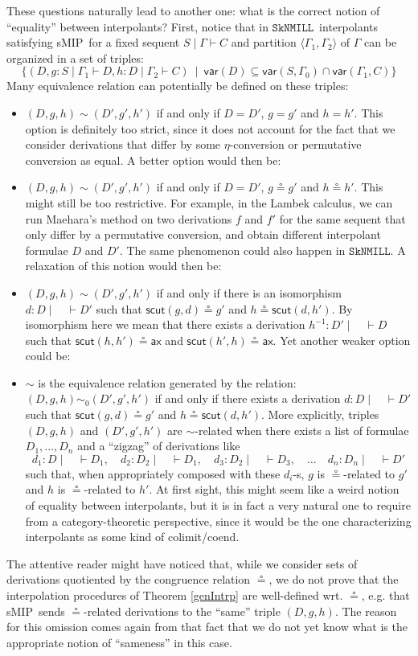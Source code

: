 \documentclass[sn-mathphys-num]{sn-jnl}%
\newcommand{\GG}{\Gamma}
\newcommand{\vd}{\vdash}
\newcommand{\ax}{\mathsf{ax}}
\newcommand{\SkNMILL}{$\mathtt{SkNMILL}$}
\newcommand{\mf}[1]{\mathsf{#1}}
\newcommand{\vars}[1]{\mf{var} (#1)}
\newcommand{\scut}[2]{\mf{scut} (#1 , #2)}
\newcommand{\sMIP}{\textsf{sMIP}}
\theoremstyle{thmstyleone}%
\theoremstyle{thmstyletwo}%
\theoremstyle{thmstylethree}%
\begin{document}
These questions naturally lead to another one: what is the correct notion of ``equality'' between interpolants?
First, notice that in \SkNMILL~interpolants satisfying \sMIP~for a fixed sequent $S \mid \GG \vd C$ and partition $\langle \GG_1,\GG_2 \rangle$ of $\GG$ can be organized in a set of triples:
\[
\{
(D, g : S \mid \GG_1 \vd D, h: D \mid \GG_2 \vd C) \ \mid \
\vars{D} \subseteq \vars{S , \GG_0} \cap \vars{\GG_1 , C}
\}
\]
Many equivalence relation can potentially be defined on these triples:
\begin{itemize}
\item $(D,g,h) \sim (D',g',h')$ if and only if $D = D'$, $g = g'$ and $h = h'$. This option is definitely too strict, since it does not account for the fact that we consider derivations that differ by some $\eta$-conversion or permutative conversion as equal. A better option would then be:
\item $(D,g,h) \sim (D',g',h')$ if and only if $D = D'$, $g \circeq g'$ and $h \circeq h'$. This might still be too restrictive. For example, in the Lambek calculus, we can run Maehara's method on two derivations $f$ and $f'$ for the same sequent that only differ by a permutative conversion, and obtain different interpolant formulae $D$ and $D'$. The same phenomenon could also happen in \SkNMILL. A relaxation of this notion would then be:
\item $(D,g,h) \sim (D',g',h')$ if and only if there is an isomorphism $d : D \mid \quad \vd D'$ such that $\mf{scut} (g,d) \circeq g'$ and $h \circeq \mf{scut} (d,h')$. By isomorphism here we mean that there exists a derivation $h^{-1} : D' \mid \quad \vd D$ such that $\scut{h}{h'} \circeq \ax$ and $\scut{h'}{h} \circeq \ax$. Yet another weaker option could be:
\item $\sim$ is the equivalence relation generated by the relation:
  $(D,g,h) \sim_0 (D',g',h')$ if and only if there exists a derivation $d : D \mid \quad \vd D'$ such that $\mf{scut} (g,d) \circeq g'$ and $h \circeq \mf{scut} (d,h')$. More explicitly, triples $(D,g,h)$ and $(D',g',h')$ are $\sim$-related when there exists a
list of formulae $D_1,\dots,D_n$ and a ``zigzag'' of derivations like
  \[
  d_1 : D \mid \quad \vd D_1,
  \quad
  d_2 : D_2 \mid \quad \vd D_1,
  \quad
  d_3 : D_2 \mid \quad \vd D_3,
  \quad
  \dots
  \quad
  d_n : D_n \mid \quad \vd D'
  \]
  such that, when appropriately composed with these $d_i$-s, $g$ is $\circeq$-related to $g'$ and $h$ is $\circeq$-related to $h'$.
  At first sight, this might seem like a weird notion of equality between interpolants, but it is in fact a very natural one to require from a category-theoretic perspective,  since it would be the one characterizing interpolants as some kind of colimit/coend.
\end{itemize}
The attentive reader might have noticed that, while we consider sets of derivations quotiented by the congruence relation $\circeq$, we do not prove that the interpolation procedures of Theorem \ref{genIntrp} are well-defined wrt. $\circeq$, e.g. that \sMIP~sends $\circeq$-related derivations to the ``same'' triple $(D,g,h)$.
The reason for this omission comes again from that fact that we do not yet know what is the appropriate notion of ``sameness'' in this case.
\end{document}
